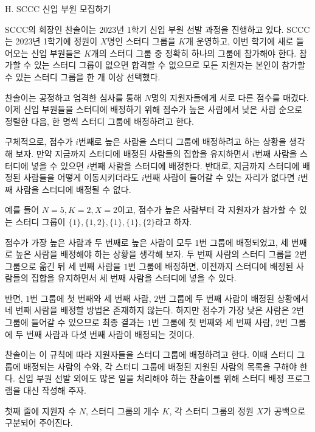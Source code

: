 \def\probtitle{SCCC 신입 부원 모집하기}
\def\probno{H}

\begin{problem}{\probno{}. \probtitle{}}

SCCC의 회장인 찬솔이는 2023년 1학기 신입 부원 선발 과정을 진행하고 있다. SCCC는 2023년 1학기에 정원이 $X$명인 스터디 그룹을 $K$개 운영하고, 이번 학기에 새로 들어오는 신입 부원들은 $K$개의 스터디 그룹 중 정확히 하나의 그룹에 참가해야 한다. 참가할 수 있는 스터디 그룹이 없으면 합격할 수 없으므로 모든 지원자는 본인이 참가할 수 있는 스터디 그룹을 한 개 이상 선택했다.

찬솔이는 공정하고 엄격한 심사를 통해 $N$명의 지원자들에게 서로 다른 점수를 매겼다. 이제 신입 부원들을 스터디에 배정하기 위해 점수가 높은 사람에서 낮은 사람 순으로 정렬한 다음, 한 명씩 스터디 그룹에 배정하려고 한다.

구체적으로, 점수가 $i$번째로 높은 사람을 스터디 그룹에 배정하려고 하는 상황을 생각해 보자. 만약 지금까지 스터디에 배정된 사람들의 집합을 유지하면서 $i$번째 사람을 스터디에 넣을 수 있으면 $i$번째 사람을 스터디에 배정한다. 반대로, 지금까지 스터디에 배정된 사람들을 어떻게 이동시키더라도 $i$번째 사람이 들어갈 수 있는 자리가 없다면 $i$번째 사람을 스터디에 배정될 수 없다.

예를 들어 $N = 5, K = 2, X = 2$이고, 점수가 높은 사람부터 각 지원자가 참가할 수 있는 스터디 그룹이 $\{1\}, \{1, 2\}, \{1\}, \{1\}, \{2\}$라고 하자.

점수가 가장 높은 사람과 두 번째로 높은 사람이 모두 $1$번 그룹에 배정되었고, 세 번째로 높은 사람을 배정해야 하는 상황을 생각해 보자. 두 번째 사람의 스터디 그룹을 $2$번 그룹으로 옮긴 뒤 세 번째 사람을 $1$번 그룹에 배정하면, 이전까지 스터디에 배정된 사람들의 집합을 유지하면서 세 번째 사람을 스터디에 넣을 수 있다.

반면, $1$번 그룹에 첫 번째와 세 번째 사람, $2$번 그룹에 두 번째 사람이 배정된 상황에서 네 번째 사람을 배정할 방법은 존재하지 않는다. 하지만 점수가 가장 낮은 사람은 $2$번 그룹에 들어갈 수 있으므로 최종 결과는 $1$번 그룹에 첫 번째와 세 번째 사람, $2$번 그룹에 두 번째 사람과 다섯 번째 사람이 배정되는 것이다.

찬솔이는 이 규칙에 따라 지원자들을 스터디 그룹에 배정하려고 한다. 이때 스터디 그룹에 배정되는 사람의 수와, 각 스터디 그룹에 배정된 지원된 사람의 목록을 구해야 한다. 신입 부원 선발 외에도 많은 일을 처리해야 하는 찬솔이를 위해 스터디 배정 프로그램을 대신 작성해 주자.


\InputFile

첫째 줄에 지원자 수 $N$, 스터디 그룹의 개수 $K$, 각 스터디 그룹의 정원 $X$가 공백으로 구분되어 주어진다.


\end{problem}
